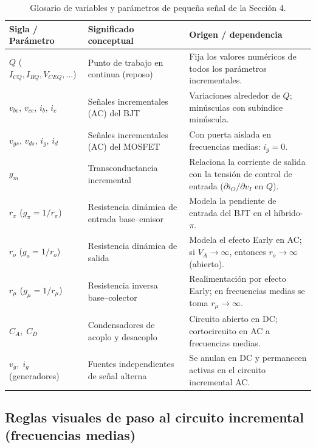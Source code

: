 \documentclass[11pt,a4paper]{article}
\begin{document}
	\begin{table}[H]
		\centering
		\footnotesize
		\begin{tabularx}{\textwidth}{@{}>{\raggedright\arraybackslash}p{3.4cm} >{\raggedright\arraybackslash}p{4.6cm} >{\raggedright\arraybackslash}X@{}}
			\toprule
			\rowcolor{mainblue!15}
			\textbf{Sigla / Parámetro} & \textbf{Significado conceptual} & \textbf{Origen / dependencia} \\
			\midrule
			$Q$ ($I_{CQ}, I_{BQ}, V_{CEQ}, \ldots$) & Punto de trabajo en continua (reposo) & Fija los valores numéricos de todos los parámetros incrementales. \\
			$v_{be},\, v_{ce},\, i_b,\, i_c$ & Señales incrementales (AC) del BJT & Variaciones alrededor de $Q$; minúsculas con subíndice minúscula. \\
			$v_{gs},\, v_{ds},\, i_g,\, i_d$ & Señales incrementales (AC) del MOSFET & Con puerta aislada en frecuencias medias: $i_g = 0$. \\
			$g_m$ & Transconductancia incremental & Relaciona la corriente de salida con la tensión de control de entrada ($\partial i_O / \partial v_I$ en $Q$). \\
			$r_\pi$ ($g_\pi = 1/r_\pi$) & Resistencia dinámica de entrada base--emisor & Modela la pendiente de entrada del BJT en el híbrido-$\pi$. \\
			$r_o$ ($g_o = 1/r_o$) & Resistencia dinámica de salida & Modela el efecto Early en AC; si $V_A \to \infty$, entonces $r_o \to \infty$ (abierto). \\
			$r_\mu$ ($g_\mu = 1/r_\mu$) & Resistencia inversa base--colector & Realimentación por efecto Early; en frecuencias medias se toma $r_\mu \to \infty$. \\
			$C_A,\; C_D$ & Condensadores de acoplo y desacoplo & Circuito abierto en DC; cortocircuito en AC a frecuencias medias. \\
			$v_g,\; i_g$ (generadores) & Fuentes independientes de señal alterna & Se anulan en DC y permanecen activas en el circuito incremental AC. \\
			\bottomrule
		\end{tabularx}
		\caption{Glosario de variables y parámetros de pequeña señal de la Sección 4.}
	\end{table}

	\subsection{Reglas visuales de paso al circuito incremental (frecuencias medias)}
\end{document}
